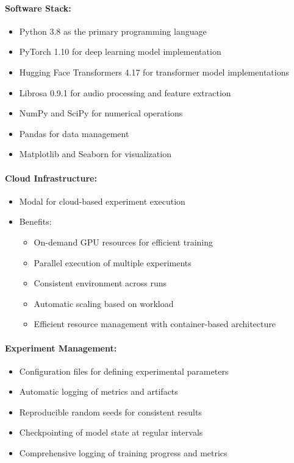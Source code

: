 \documentclass[12pt]{article}
\begin{document}
\paragraph{Software Stack:}
\begin{itemize}
    \item Python 3.8 as the primary programming language
    \item PyTorch 1.10 for deep learning model implementation
    \item Hugging Face Transformers 4.17 for transformer model implementations
    \item Librosa 0.9.1 for audio processing and feature extraction
    \item NumPy and SciPy for numerical operations
    \item Pandas for data management
    \item Matplotlib and Seaborn for visualization
\end{itemize}

\paragraph{Cloud Infrastructure:}
\begin{itemize}
    \item Modal for cloud-based experiment execution
    \item Benefits:
    \begin{itemize}
        \item On-demand GPU resources for efficient training
        \item Parallel execution of multiple experiments
        \item Consistent environment across runs
        \item Automatic scaling based on workload
        \item Efficient resource management with container-based architecture
    \end{itemize}
\end{itemize}

\paragraph{Experiment Management:}
\begin{itemize}
    \item Configuration files for defining experimental parameters
    \item Automatic logging of metrics and artifacts
    \item Reproducible random seeds for consistent results
    \item Checkpointing of model state at regular intervals
    \item Comprehensive logging of training progress and metrics
\end{itemize}
\end{document}
